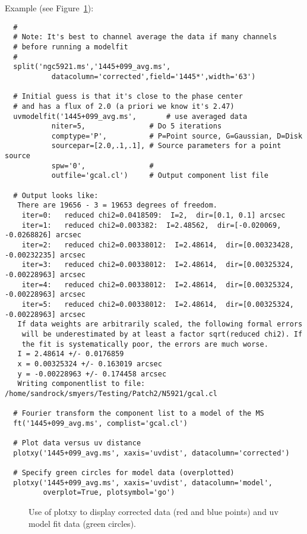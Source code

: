 Example (see Figure~\ref{fig:modelfit}):
\small
\begin{verbatim}
  #
  # Note: It's best to channel average the data if many channels
  # before running a modelfit
  #
  split('ngc5921.ms','1445+099_avg.ms',
           datacolumn='corrected',field='1445*',width='63')

  # Initial guess is that it's close to the phase center
  # and has a flux of 2.0 (a priori we know it's 2.47)
  uvmodelfit('1445+099_avg.ms',       # use averaged data
           niter=5,               # Do 5 iterations
           comptype='P',          # P=Point source, G=Gaussian, D=Disk
           sourcepar=[2.0,.1,.1], # Source parameters for a point source
           spw='0',               # 
           outfile='gcal.cl')     # Output component list file
  
  # Output looks like:
   There are 19656 - 3 = 19653 degrees of freedom.
    iter=0:   reduced chi2=0.0418509:  I=2,  dir=[0.1, 0.1] arcsec
    iter=1:   reduced chi2=0.003382:  I=2.48562,  dir=[-0.020069, -0.0268826] arcsec
    iter=2:   reduced chi2=0.00338012:  I=2.48614,  dir=[0.00323428, -0.00232235] arcsec
    iter=3:   reduced chi2=0.00338012:  I=2.48614,  dir=[0.00325324, -0.00228963] arcsec
    iter=4:   reduced chi2=0.00338012:  I=2.48614,  dir=[0.00325324, -0.00228963] arcsec
    iter=5:   reduced chi2=0.00338012:  I=2.48614,  dir=[0.00325324, -0.00228963] arcsec
   If data weights are arbitrarily scaled, the following formal errors
    will be underestimated by at least a factor sqrt(reduced chi2). If 
    the fit is systematically poor, the errors are much worse.
   I = 2.48614 +/- 0.0176859
   x = 0.00325324 +/- 0.163019 arcsec
   y = -0.00228963 +/- 0.174458 arcsec
   Writing componentlist to file: /home/sandrock/smyers/Testing/Patch2/N5921/gcal.cl

  # Fourier transform the component list to a model of the MS
  ft('1445+099_avg.ms', complist='gcal.cl')           

  # Plot data versus uv distance
  plotxy('1445+099_avg.ms', xaxis='uvdist', datacolumn='corrected')

  # Specify green circles for model data (overplotted)
  plotxy('1445+099_avg.ms', xaxis='uvdist', datacolumn='model',
         overplot=True, plotsymbol='go') 
\end{verbatim}
\normalsize

\begin{figure}[h!]
\begin{center}
\caption{\label{fig:modelfit} Use of plotxy to display corrected data
  (red and blue points) and uv model fit data (green circles).} 
\hrulefill
\end{center}
\end{figure}


